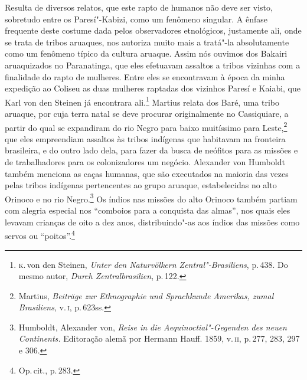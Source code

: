 Resulta de diversos relatos, que este rapto de humanos não deve ser
visto, sobretudo entre os Paresí"-Kabizi, como um fenômeno singular. A
ênfase frequente deste costume dada pelos observadores etnológicos,
justamente ali, onde se trata de tribos aruaques, nos autoriza muito mais
a tratá"-la absolutamente como um fenômeno típico da cultura aruaque.
Assim nós ouvimos dos Bakairi aruaquizados no Paranatinga, que eles
efetuavam assaltos a tribos vizinhas com a finalidade do rapto de
mulheres. Entre eles se encontravam à época da minha expedição ao
Coliseu as duas mulheres raptadas dos vizinhos Paresí e Kaiabi, que Karl
von den Steinen já encontrara ali.\footnote{\textsc{k}.\,von den Steinen,
  \textit{Unter den Naturvölkern Zentral"-Brasiliens}, p.\,438. Do mesmo
  autor, \textit{Durch Zentralbrasilien}, p.\,122.} Martius relata dos
Baré, uma tribo aruaque, por cuja terra natal se deve procurar
originalmente no Cassiquiare, a partir do qual se expandiram do rio
Negro para baixo muitíssimo para Leste,\footnote{Martius, \textit{Beiträge
  zur Ethnographie und Sprachkunde Amerikas, zumal Brasiliens}, v.\,\textsc{i},
  p.\,623ss.} que eles empreendiam assaltos às tribos indígenas que
habitavam na fronteira brasileira, e do outro lado dela, para fazer da
busca de neófitos para as missões e de trabalhadores para os
colonizadores um negócio. Alexander von Humboldt também menciona as
caças humanas, que são executados na maioria das vezes pelas tribos
indígenas pertencentes ao grupo aruaque, estabelecidas no alto Orinoco e
no rio Negro.\footnote{Humboldt, Alexander von, \textit{Reise in die
  Aequinoctial"-Gegenden des neuen Continents.} Editoração alemã por
  Hermann Hauff. 1859, v.\,\textsc{ii}, p.\,277, 283, 297 e 306.} Os índios nas
missões do alto Orinoco também partiam com alegria especial nos
``comboios para a conquista das almas'', nos quais eles levavam
crianças de oito a dez anos, distribuindo"-as aos índios das missões como
servos ou ``poitos''.\footnote{Op.\,cit., p.\,283.}

